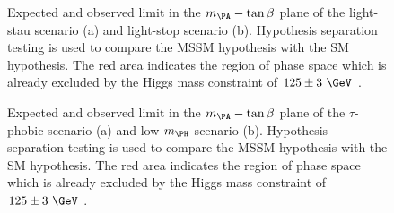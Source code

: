 \begin{figure}[tbh]
\caption{Expected and observed limit in the $m_{\PA}-\tan\beta$ plane of the
light-stau scenario (a) and light-stop scenario (b). Hypothesis
separation testing is used to compare the \ac{MSSM} hypothesis with the SM
hypothesis. The red area indicates the region of phase space which is already
excluded by the Higgs mass constraint of $125\pm3~\GeV$ \cite{HIG-13-021}.}
\label{fig:lightstaulightstop}
\end{figure}

\begin{figure}[tbh]
\caption{Expected and observed limit in the $m_{\PA}-\tan\beta$ plane of the
$\tau$-phobic scenario (a) and low-$m_{\PH}$ scenario (b). Hypothesis
separation testing is used to compare the \ac{MSSM} hypothesis with the SM
hypothesis. The red area indicates the region of phase space which is already
excluded by the Higgs mass constraint of $125\pm3~\GeV$ \cite{HIG-13-021}.}
\label{fig:tauphobiclowmH}
\end{figure}
